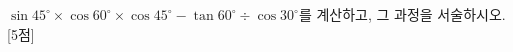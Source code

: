 $\sin 45^\circ\times\cos 60^\circ\times\cos 45^\circ-\tan 60^\circ\div\cos 30^\circ$를 계산하고, 그 과정을 서술하시오. \mbox{[5점]}
